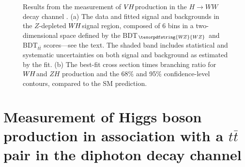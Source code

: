 \documentclass{moriond}
\def\wh{\texorpdfstring{\ensuremath{W\kern -0.1em H}\xspace}{WH\xspace}}
\def\wz{\texorpdfstring{\ensuremath{W\kern -0.1em Z}\xspace}{WZ\xspace}}
\def\vh{\texorpdfstring{\ensuremath{V\kern -0.1em H}\xspace}{VH\xspace}}
\def\zh{\ensuremath{ZH}\xspace}
\def\ttbar{\ensuremath{t\bar{t}}\xspace}
\begin{document}
\begin{figure}[!htbp]
  \centering
  \caption{
    Results from the measurement of \vh production in the $H{\rightarrow}WW$ decay channel \cite{HIGG-2017-14}.
    (a) The data and fitted signal and backgrounds in the $Z$-depleted \wh signal region, composed of 6 bins in a
    two-dimensional space defined by the BDT$_{\wz}$ and BDT$_{\ttbar}$ scores---see the text.
    The shaded band includes statistical and systematic uncertainties on both signal and background as estimated by the fit.
    (b) The best-fit cross section times branching ratio for \wh and \zh production and the 68\% and
    95\% confidence-level contours, compared to the SM prediction.
  }
  \label{fig:ww_vh}
\end{figure}

\section{Measurement of Higgs boson production in association with a $t\bar t$ pair in the diphoton decay channel}\label{sec:ttH_yy}
\end{document}
